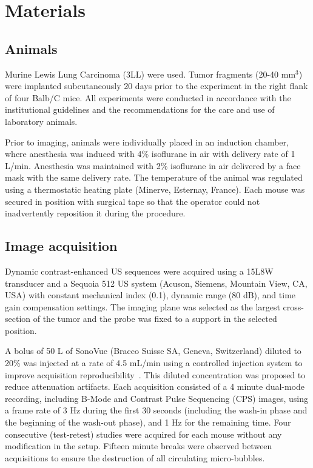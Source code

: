 \section{Materials}

\subsection{Animals}
Murine Lewis Lung Carcinoma (3LL) were used. Tumor fragments (20-40 mm$^3$) were implanted subcutaneously 20 days prior to the experiment in the right flank of four Balb/C mice. All experiments were conducted in accordance with the institutional guidelines and the recommendations for the care and use of laboratory animals. 

Prior to imaging, animals were individually placed in an induction chamber, where anesthesia was induced with 4\% isoflurane in air with delivery rate of 1 L/min. 
Anesthesia was maintained with 2\% isoflurane in air delivered by a face mask with the same delivery rate. 
The temperature of the animal was regulated using a thermostatic heating plate (Minerve, Esternay, France). Each mouse was secured in position with surgical tape so that the operator could not inadvertently reposition it during the procedure. 


\subsection{Image acquisition}
Dynamic contrast-enhanced US sequences were acquired using a 15L8W transducer and a Sequoia 512 US system (Acuson, Siemens, Mountain View, CA, USA) with constant mechanical index (0.1), dynamic range (80 dB), and time gain compensation settings.
The imaging plane was selected as the largest cross-section of the tumor and the probe was fixed to a support in the selected position.

A bolus of 50 \textmu L of SonoVue (Bracco Suisse SA, Geneva, Switzerland) diluted to 20\% was injected at a rate of 4.5 mL/min using a controlled injection system to improve acquisition reproducibility~\cite{Dizeux2016cd}. This diluted concentration was proposed to reduce attenuation artifacts. Each acquisition consisted of a 4 minute dual-mode recording, including B-Mode and Contrast Pulse Sequencing (CPS) images, using a frame rate of 3 Hz during the first 30 seconds (including the wash-in phase and the beginning of the wash-out phase), and 1 Hz for the remaining time. Four consecutive (test-retest) studies were acquired for each mouse without any modification in the setup. Fifteen minute breaks were observed between acquisitions to ensure the destruction of all circulating micro-bubbles.

